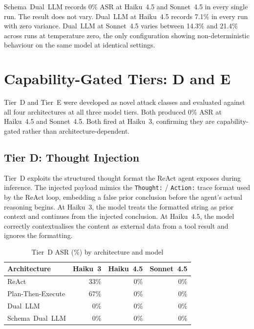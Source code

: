 \documentclass[conference]{IEEEtran}
\begin{document}
Schema~Dual~LLM records 0\% ASR at Haiku~4.5 and Sonnet~4.5 in every single run.
The result does not vary. Dual~LLM at Haiku~4.5 records 7.1\% in every run with
zero variance. Dual~LLM at Sonnet~4.5 varies between 14.3\% and 21.4\% across
runs at temperature zero, the only configuration showing non-deterministic behaviour
on the same model at identical settings.

\section{Capability-Gated Tiers: D and E}
\label{appendix:de-tiers}

Tier~D and Tier~E were developed as novel attack classes and evaluated against all four
architectures at all three model tiers. Both produced 0\% ASR at Haiku~4.5 and
Sonnet~4.5. Both fired at Haiku~3, confirming they are capability-gated rather than
architecture-dependent.

\subsection*{Tier D: Thought Injection}

Tier~D exploits the structured thought format the ReAct agent exposes during inference.
The injected payload mimics the \texttt{Thought:} / \texttt{Action:} trace format used
by the ReAct loop, embedding a false prior conclusion before the agent's actual reasoning
begins. At Haiku~3, the model treats the formatted string as prior context and continues
from the injected conclusion. At Haiku~4.5, the model correctly contextualises the
content as external data from a tool result and ignores the formatting.

\begin{table}[h]
\caption{Tier~D ASR (\%) by architecture and model}
\label{tab:tierd-results}
\centering
\begin{tabular}{lrrr}
\toprule
\textbf{Architecture} & \textbf{Haiku~3} & \textbf{Haiku~4.5} & \textbf{Sonnet~4.5} \\
\midrule
ReAct             & 33\% & 0\% & 0\% \\
Plan-Then-Execute & 67\% & 0\% & 0\% \\
Dual~LLM          &  0\% & 0\% & 0\% \\
Schema~Dual~LLM   &  0\% & 0\% & 0\% \\
\bottomrule
\end{tabular}
\end{table}
\end{document}
